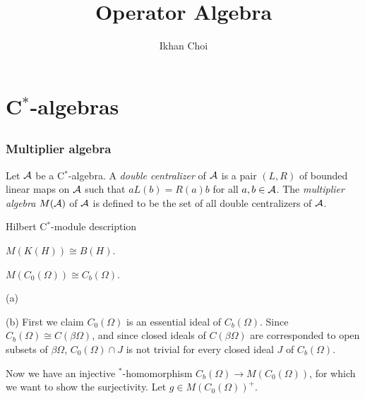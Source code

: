 \documentclass{../note}
\begin{document}
\title{Operator Algebra}
\author{Ikhan Choi}
\maketitle
\tableofcontents

\part{C$^*$-algebras}
\chapter{}




\section{Multiplier algebra}

\begin{prb}
Let $\mathcal{A}$ be a C$^*$-algebra.
A \emph{double centralizer} of $\mathcal{A}$ is a pair $(L,R)$ of bounded linear maps on $\mathcal{A}$ such that $aL(b)=R(a)b$ for all $a,b\in\mathcal{A}$.
The \emph{multiplier algebra} $M(\mathcal{A})$ of $\mathcal{A}$ is defined to be the set of all double centralizers of $\mathcal{A}$.
\end{prb}

\begin{prb}
\begin{parts}
\item Hilbert C$^*$-module description
\end{parts}
\end{prb}

\begin{prb}
\begin{parts}
\item $M(K(H))\cong B(H)$.
\item $M(C_0(\Omega))\cong C_b(\Omega)$.
\end{parts}
\end{prb}
\begin{pf}
(a)

(b)
First we claim $C_0(\Omega)$ is an essential ideal of $C_b(\Omega)$.
Since $C_b(\Omega)\cong C(\beta\Omega)$, and since closed ideals of $C(\beta\Omega)$ are corresponded to open subsets of $\beta\Omega$, $C_0(\Omega)\cap J$ is not trivial for every closed ideal $J$ of $C_b(\Omega)$.

Now we have an injective $^*$-homomorphism $C_b(\Omega)\to M(C_0(\Omega))$, for which we want to show the surjectivity.
Let $g\in M(C_0(\Omega))^+$.
\end{pf}
\end{document}
